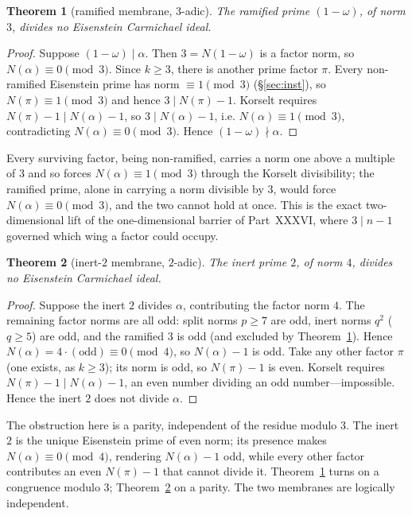 \documentclass[11pt]{article}
\newtheorem{theorem}{Theorem}
\begin{document}
\begin{theorem}[ramified membrane, $3$-adic]\label{thm:ram}
The ramified prime $(1-\omega)$, of norm $3$, divides no Eisenstein Carmichael ideal.
\end{theorem}
\begin{proof}
Suppose $(1-\omega)\mid\alpha$. Then $3=N(1-\omega)$ is a factor norm, so $N(\alpha)\equiv0\pmod3$.
Since $k\ge3$, there is another prime factor $\pi$. Every non-ramified Eisenstein prime has norm
$\equiv1\pmod3$ (\S\ref{sec:inst}), so $N(\pi)\equiv1\pmod3$ and hence $3\mid N(\pi)-1$. Korselt
requires $N(\pi)-1\mid N(\alpha)-1$, so $3\mid N(\alpha)-1$, i.e. $N(\alpha)\equiv1\pmod3$,
contradicting $N(\alpha)\equiv0\pmod3$. Hence $(1-\omega)\nmid\alpha$.
\end{proof}

Every surviving factor, being non-ramified, carries a norm one above a multiple of $3$ and so forces
$N(\alpha)\equiv1\pmod3$ through the Korselt divisibility; the ramified prime, alone in carrying a norm
divisible by $3$, would force $N(\alpha)\equiv0\pmod3$, and the two cannot hold at once. This is the
exact two-dimensional lift of the one-dimensional barrier of Part~XXXVI, where $3\mid n-1$ governed
which wing a factor could occupy.

\begin{theorem}[inert-$2$ membrane, $2$-adic]\label{thm:inert}
The inert prime $2$, of norm $4$, divides no Eisenstein Carmichael ideal.
\end{theorem}
\begin{proof}
Suppose the inert $2$ divides $\alpha$, contributing the factor norm $4$. The remaining factor norms
are all odd: split norms $p\ge7$ are odd, inert norms $q^2$ ($q\ge5$) are odd, and the ramified $3$ is
odd (and excluded by Theorem~\ref{thm:ram}). Hence $N(\alpha)=4\cdot(\text{odd})\equiv0\pmod4$, so
$N(\alpha)-1$ is odd. Take any other factor $\pi$ (one exists, as $k\ge3$); its norm is odd, so
$N(\pi)-1$ is even. Korselt requires $N(\pi)-1\mid N(\alpha)-1$, an even number dividing an odd
number---impossible. Hence the inert $2$ does not divide $\alpha$.
\end{proof}

The obstruction here is a parity, independent of the residue modulo $3$. The inert $2$ is the unique
Eisenstein prime of even norm; its presence makes $N(\alpha)\equiv0\pmod4$, rendering $N(\alpha)-1$
odd, while every other factor contributes an even $N(\pi)-1$ that cannot divide it. Theorem~\ref{thm:ram}
turns on a congruence modulo $3$; Theorem~\ref{thm:inert} on a parity. The two membranes are logically
independent.
\end{document}
